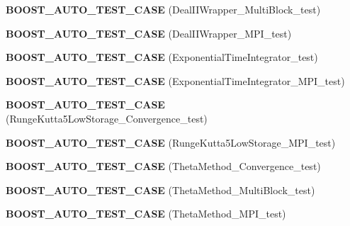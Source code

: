 \begin{DoxyCompactItemize}
\item 
\hypertarget{namespacenatrium_abc807165bb6f713d05eeec21612df097}{
{\bfseries BOOST\_\-AUTO\_\-TEST\_\-CASE} (DealIIWrapper\_\-MultiBlock\_\-test)}
\label{namespacenatrium_abc807165bb6f713d05eeec21612df097}

\item 
\hypertarget{namespacenatrium_a71c27b988e4175b7a40b3a35472dcf17}{
{\bfseries BOOST\_\-AUTO\_\-TEST\_\-CASE} (DealIIWrapper\_\-MPI\_\-test)}
\label{namespacenatrium_a71c27b988e4175b7a40b3a35472dcf17}

\item 
\hypertarget{namespacenatrium_a061f5535433c3c834eca7c3438d8d438}{
{\bfseries BOOST\_\-AUTO\_\-TEST\_\-CASE} (ExponentialTimeIntegrator\_\-test)}
\label{namespacenatrium_a061f5535433c3c834eca7c3438d8d438}

\item 
\hypertarget{namespacenatrium_a3ae22811692fba80a6a0de5b843877fe}{
{\bfseries BOOST\_\-AUTO\_\-TEST\_\-CASE} (ExponentialTimeIntegrator\_\-MPI\_\-test)}
\label{namespacenatrium_a3ae22811692fba80a6a0de5b843877fe}

\item 
\hypertarget{namespacenatrium_a11f2ca3b923a75460c139b6a8a5829ae}{
{\bfseries BOOST\_\-AUTO\_\-TEST\_\-CASE} (RungeKutta5LowStorage\_\-Convergence\_\-test)}
\label{namespacenatrium_a11f2ca3b923a75460c139b6a8a5829ae}

\item 
\hypertarget{namespacenatrium_a46aa1d17c95e14848fe9e4bf06920eb9}{
{\bfseries BOOST\_\-AUTO\_\-TEST\_\-CASE} (RungeKutta5LowStorage\_\-MPI\_\-test)}
\label{namespacenatrium_a46aa1d17c95e14848fe9e4bf06920eb9}

\item 
\hypertarget{namespacenatrium_ab2f8301ae61e983bdf79275749c43db5}{
{\bfseries BOOST\_\-AUTO\_\-TEST\_\-CASE} (ThetaMethod\_\-Convergence\_\-test)}
\label{namespacenatrium_ab2f8301ae61e983bdf79275749c43db5}

\item 
\hypertarget{namespacenatrium_ab08bd8b94d961571a14c779cb6f43ea5}{
{\bfseries BOOST\_\-AUTO\_\-TEST\_\-CASE} (ThetaMethod\_\-MultiBlock\_\-test)}
\label{namespacenatrium_ab08bd8b94d961571a14c779cb6f43ea5}

\item 
\hypertarget{namespacenatrium_ad6e4cd3c4519457f2fcab08ccf941cab}{
{\bfseries BOOST\_\-AUTO\_\-TEST\_\-CASE} (ThetaMethod\_\-MPI\_\-test)}
\label{namespacenatrium_ad6e4cd3c4519457f2fcab08ccf941cab}


\end{DoxyCompactItemize}
